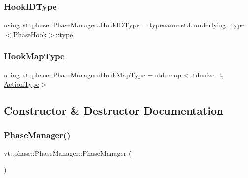 \mbox{\label{structvt_1_1phase_1_1_phase_manager_a552ed398953e67cd97c440a7f39a8a6c}} 
\subsubsection{\texorpdfstring{Hook\+I\+D\+Type}{HookIDType}}
{\footnotesize\ttfamily using \hyperlink{structvt_1_1phase_1_1_phase_manager_a552ed398953e67cd97c440a7f39a8a6c}{vt\+::phase\+::\+Phase\+Manager\+::\+Hook\+I\+D\+Type} =  typename std\+::underlying\+\_\+type$<$\hyperlink{namespacevt_1_1phase_aec9a63fdd99680d7a7fe99d321193811}{Phase\+Hook}$>$\+::type}

\mbox{\label{structvt_1_1phase_1_1_phase_manager_aa8583887716955f4bd4f438bc26141e9}} 
\subsubsection{\texorpdfstring{Hook\+Map\+Type}{HookMapType}}
{\footnotesize\ttfamily using \hyperlink{structvt_1_1phase_1_1_phase_manager_aa8583887716955f4bd4f438bc26141e9}{vt\+::phase\+::\+Phase\+Manager\+::\+Hook\+Map\+Type} =  std\+::map$<$std\+::size\+\_\+t, \hyperlink{namespacevt_ae0a5a7b18cc99d7b732cb4d44f46b0f3}{Action\+Type}$>$}



\subsection{Constructor \& Destructor Documentation}
\mbox{\label{structvt_1_1phase_1_1_phase_manager_af2b50706948fb9c1ad4b561ac9933040}} 
\subsubsection{\texorpdfstring{Phase\+Manager()}{PhaseManager()}}
{\footnotesize\ttfamily vt\+::phase\+::\+Phase\+Manager\+::\+Phase\+Manager (\begin{DoxyParamCaption}{ }\end{DoxyParamCaption})\hspace{0.3cm}{\ttfamily [default]}}



